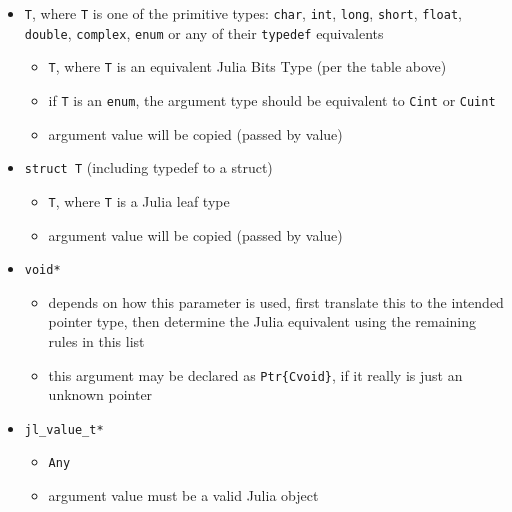 \begin{itemize}
\item \texttt{T}, where \texttt{T} is one of the primitive types: \texttt{char}, \texttt{int}, \texttt{long}, \texttt{short}, \texttt{float}, \texttt{double}, \texttt{complex}, \texttt{enum} or any of their \texttt{typedef} equivalents

\begin{itemize}
\item \texttt{T}, where \texttt{T} is an equivalent Julia Bits Type (per the table above)


\item if \texttt{T} is an \texttt{enum}, the argument type should be equivalent to \texttt{Cint} or \texttt{Cuint}


\item argument value will be copied (passed by value)

\end{itemize}

\item \texttt{struct T} (including typedef to a struct)

\begin{itemize}
\item \texttt{T}, where \texttt{T} is a Julia leaf type


\item argument value will be copied (passed by value)

\end{itemize}

\item \texttt{void*}

\begin{itemize}
\item depends on how this parameter is used, first translate this to the intended pointer type, then determine the Julia equivalent using the remaining rules in this list


\item this argument may be declared as \texttt{Ptr\{Cvoid\}}, if it really is just an unknown pointer

\end{itemize}

\item \texttt{jl\_value\_t*}

\begin{itemize}
\item \texttt{Any}


\item argument value must be a valid Julia object


\end{itemize}
\end{itemize}
